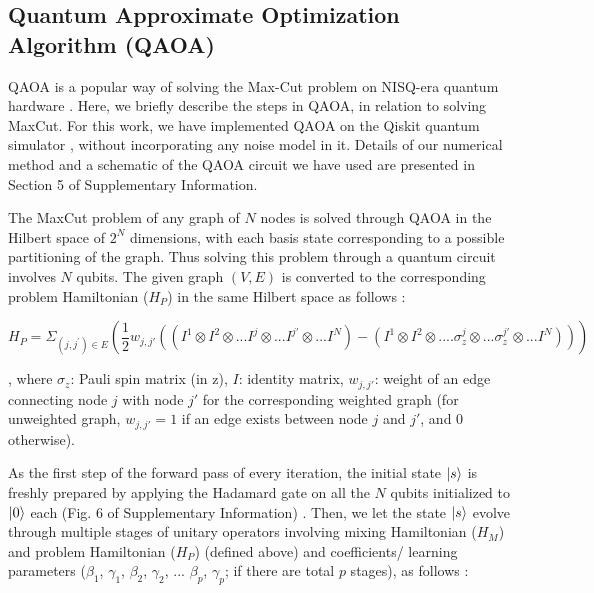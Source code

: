 \documentclass[10pt]{article}
\begin{document}



\subsection{Quantum Approximate Optimization Algorithm (QAOA)}


QAOA is a popular way of solving the Max-Cut problem on NISQ-era quantum hardware \cite{QAOA_Farhi,NISQReview,QuantumAnnealingvsQAOA1}. Here, we briefly describe the steps in QAOA, in relation to solving MaxCut. For this work, we have implemented QAOA on the Qiskit quantum simulator \cite{Qiskit}, without incorporating any noise model in it. Details of our numerical method and a schematic of the QAOA circuit we have used are presented in Section 5 of Supplementary Information.  


The MaxCut problem of any graph of $N$ nodes is solved through QAOA in the Hilbert space of $2^{N}$ dimensions, with each basis state corresponding to a possible partitioning of the graph. Thus solving this problem through a quantum circuit involves $N$ qubits. The given graph $(V,E)$ is converted to the corresponding problem Hamiltonian ($H_{P}$) in the same Hilbert space as follows \cite{QAOA_Farhi, QAOA_Tutorial}: 


\begin{equation}
H_P= \Sigma_{(j,j^{'})\in E}(\frac{1}{2}w_{j,j'}((I^{1}
\otimes I^{2} \otimes ... I^{j}\otimes...I^{j'}\otimes...I^{N})
-(I^{1} \otimes I^{2} \otimes .... \sigma_z^{j}\otimes ...\sigma_z^{j'}\otimes... I^{N})))
\label{QAOA_Hp}
\end{equation} 

, where $\sigma_z$: Pauli spin matrix (in z), $I$: identity matrix, $w_{j,j'}$: weight of an edge connecting node $j$ with node $j'$ for the corresponding weighted graph (for unweighted graph, $w_{j,j'}=1$ if an edge exists between node $j$ and $j'$, and 0 otherwise). 

As the first step of the forward pass of every iteration, the initial state $\ket{s}$ is freshly prepared by applying the Hadamard gate on all the $N$ qubits initialized to $\ket{0}$ each (Fig. 6 of Supplementary Information) \cite{QAOA_Tutorial}. Then,  we let the state $\ket{s}$ evolve through multiple stages of unitary operators involving mixing Hamiltonian ($H_M$) and problem Hamiltonian ($H_P$) (defined above) and coefficients/ learning parameters ($\beta_1$, $\gamma_1$, $\beta_2$, $\gamma_2$, ... $\beta_p$, $\gamma_p$; if there are total $p$ stages), as follows \cite{QAOA_Farhi, QAOA_Tutorial}: 
\end{document}
